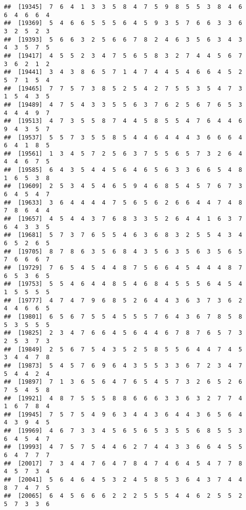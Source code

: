 \documentclass[
]{book}
\begin{document}
\begin{verbatim}
##  [19345]  7  6  4  1  3  3  5  8  4  7  5  9  8  5  5  3  8  4  6  6  4  6  6  4
##  [19369]  5  4  6  6  5  5  5  6  4  5  9  3  5  7  6  6  3  3  6  3  2  5  2  3
##  [19393]  5  6  6  3  2  5  6  6  7  8  2  4  6  3  5  6  3  4  3  4  3  5  7  5
##  [19417]  4  5  5  2  3  4  7  5  6  5  8  3  2  7  4  4  5  6  7  3  6  2  1  2
##  [19441]  3  4  3  8  6  5  7  1  4  7  4  4  5  4  6  6  4  5  2  5  7  1  5  4
##  [19465]  7  7  5  7  3  8  5  2  5  4  2  7  5  5  3  5  4  7  3  1  5  4  3  5
##  [19489]  4  7  5  4  3  3  5  5  6  3  7  6  2  5  6  7  6  5  3  4  4  4  9  7
##  [19513]  4  7  3  5  5  8  7  4  4  5  8  5  5  4  7  6  4  4  6  9  4  3  5  7
##  [19537]  5  5  7  3  5  5  8  5  4  4  6  4  4  4  3  6  6  6  4  6  4  1  8  5
##  [19561]  1  3  4  5  7  2  5  6  3  7  5  5  6  5  7  3  2  6  4  4  4  6  7  5
##  [19585]  6  4  3  5  4  4  5  6  4  6  5  6  3  3  6  6  5  4  8  1  6  5  3  8
##  [19609]  2  5  3  4  5  4  6  5  9  4  6  8  5  4  5  7  6  7  3  6  4  5  4  7
##  [19633]  3  6  4  4  4  4  7  5  6  5  6  2  6  6  4  4  7  4  8  7  8  6  4  4
##  [19657]  4  5  4  4  3  7  6  8  3  3  5  2  6  4  4  1  6  3  7  6  4  3  3  5
##  [19681]  5  7  3  7  6  5  5  4  6  3  6  8  3  2  5  5  4  3  4  6  5  2  6  5
##  [19705]  8  7  8  6  3  5  6  8  4  3  5  6  3  5  6  3  5  6  5  7  6  6  6  7
##  [19729]  7  6  5  4  5  4  4  8  7  5  6  6  4  5  4  4  4  8  7  6  5  3  6  5
##  [19753]  5  5  4  6  4  4  8  5  4  6  8  4  5  5  5  6  4  5  4  1  5  5  5  5
##  [19777]  4  7  4  7  9  6  8  5  2  6  4  4  3  6  3  7  3  6  2  4  4  6  6  5
##  [19801]  6  5  6  7  5  5  4  5  5  5  7  6  4  3  6  7  8  5  8  5  3  5  5  5
##  [19825]  2  3  4  7  6  6  4  5  6  4  4  6  7  8  7  6  5  7  3  2  5  3  7  3
##  [19849]  2  5  6  7  5  4  3  5  2  5  8  5  5  6  4  4  7  4  5  3  4  4  7  8
##  [19873]  5  4  5  7  6  9  6  4  3  5  5  3  3  6  7  2  3  4  7  5  4  4  2  4
##  [19897]  7  1  3  6  5  6  4  7  6  5  4  5  7  3  2  6  5  2  6  7  5  4  5  8
##  [19921]  4  8  7  5  5  5  8  8  6  6  6  3  3  6  3  2  7  7  4  1  6  7  8  4
##  [19945]  7  5  7  5  4  9  6  3  4  4  3  6  4  4  3  6  5  6  4  4  3  9  4  5
##  [19969]  4  6  7  3  3  4  5  6  5  6  5  3  5  5  6  8  5  5  3  6  4  5  4  7
##  [19993]  4  7  5  7  5  4  4  6  2  7  4  4  3  3  6  6  4  5  5  6  4  7  7  7
##  [20017]  7  3  4  4  7  6  4  7  8  4  7  4  6  4  5  4  7  7  8  4  5  7  3  4
##  [20041]  5  6  4  6  4  5  3  2  4  5  8  5  3  6  4  3  7  4  4  8  7  4  7  5
##  [20065]  6  4  5  6  6  6  2  2  2  5  5  5  4  4  6  2  5  5  2  5  7  3  3  6

\end{verbatim}
\end{document}
